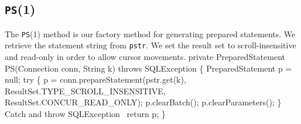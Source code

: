 \documentclass{article}
\def\nwendcode{\endtrivlist \endgroup}      %
\let\nwdocspar=\par
\theoremstyle{definition}                   %
\begin{document}
\subsection{{\tt{}\protect{}PS}(1)}
The {\tt{}\protect{}PS}(1) method is our factory method for generating prepared statements.
We retrieve the statement string from {\tt{}\protect{}pstr}.  We set the result set to
scroll-insensitive and read-only in order to allow cursor movements.
\nwenddocs{}\endmoddef{}
private PreparedStatement PS(Connection conn, String k) throws SQLException \{
  PreparedStatement p = null;
  try \{
    p = conn.prepareStatement(pstr.get(k),
      ResultSet.TYPE_SCROLL_INSENSITIVE, ResultSet.CONCUR_READ_ONLY);
    p.clearBatch();
    p.clearParameters();
  \}
  \LA{}Catch and throw \code{}SQLException\edoc{}~{\nwtagstyle{}}\RA{}
  return p;
\}
\eatline
{}\nwendcode{}\nwdocspar
\end{document}
